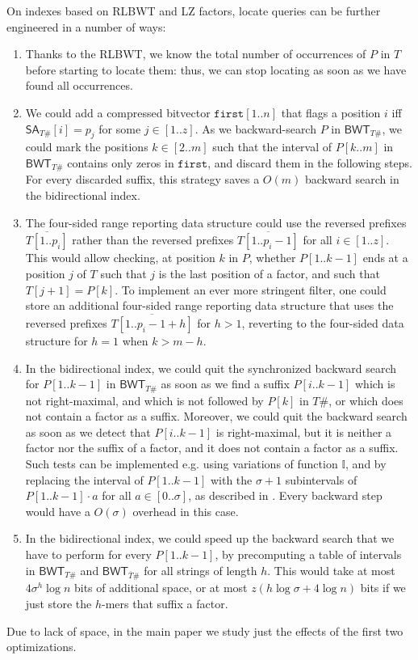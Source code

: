 \documentclass[a4paper,UKenglish]{lipics-v2016}
\newcommand{\REV}[1]{\ensuremath{\overline{#1}}}
\newcommand{\SA}{\ensuremath{\mathsf{SA}}}
\newcommand{\BWT}{\ensuremath{\mathsf{BWT}}}
\newcommand{\INTERVALFUNCTION}{\ensuremath{\mathbb{I}}}
\begin{document}
On indexes based on RLBWT and LZ factors, locate queries can be further engineered in a number of ways:
\begin{enumerate}
\item Thanks to the RLBWT, we know the total number of occurrences of $P$ in $T$ before starting to locate them: thus, we can stop locating as soon as we have found all occurrences.

\item We could add a compressed bitvector $\mathtt{first}[1..n]$ that flags a position $i$ iff $\SA_{T\#}[i]=p_j$ for some $j \in [1..z]$. As we backward-search $P$ in $\BWT_{T\#}$, we could mark the positions $k \in [2..m]$ such that the interval of $P[k..m]$ in $\BWT_{T\#}$ contains only zeros in $\mathtt{first}$, and discard them in the following steps. For every discarded suffix, this strategy saves a $O(m)$ backward search in the bidirectional index.


\item The four-sided range reporting data structure could use the reversed prefixes $\REV{T[1..p_i]}$ rather than the reversed prefixes $\REV{T[1..p_{i}-1]}$ for all $i \in [1..z]$. This would allow checking, at position $k$ in $P$, whether $P[1..k-1]$ ends at a position $j$ of $T$ such that $j$ is the last position of a factor, and such that $T[j+1]=P[k]$. To implement an ever more stringent filter, one could store an additional four-sided range reporting data structure that uses the reversed prefixes $\REV{T[1..p_{i}-1+h]}$ for $h>1$, reverting to the four-sided data structure for $h=1$ when $k>m-h$.

\item In the bidirectional index, we could quit the synchronized backward search for $P[1..k-1]$ in $\BWT_{T\#}$ as soon as we find a suffix $P[i..k-1]$ which is not right-maximal, and which is not followed by $P[k]$ in $T\#$, or which does not contain a factor as a suffix. Moreover, we could quit the backward search as soon as we detect that $P[i..k-1]$ is right-maximal, but it is neither a factor nor the suffix of a factor, and it does not contain a factor as a suffix. Such tests can be implemented e.g. using variations of function $\INTERVALFUNCTION$, and by replacing the interval of $P[1..k-1]$ with the $\sigma+1$ subintervals of $P[1..k-1] \cdot a$ for all $a \in [0..\sigma]$, as described in \cite{belazzougui2014linear}. Every backward step would have a $O(\sigma)$ overhead in this case.

\item In the bidirectional index, we could speed up the backward search that we have to perform for every $P[1..k-1]$, by precomputing a table of intervals in $\BWT_{T\#}$ and $\BWT_{\REV{T}\#}$ for all strings of length $h$. This would take at most $4\sigma^{h}\log{n}$ bits of additional space, or at most $z(h\log{\sigma}+4\log{n})$ bits if we just store the $h$-mers that suffix a factor.
\end{enumerate}

Due to lack of space, in the main paper we study just the effects of the first two optimizations.
\end{document}
